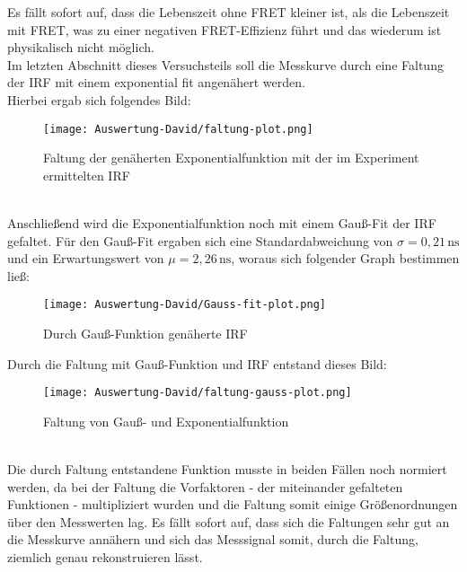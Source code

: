 Es fällt sofort auf, dass die Lebenszeit ohne FRET kleiner ist, als die Lebenszeit mit FRET, was zu einer negativen FRET-Effizienz führt und das wiederum ist physikalisch nicht möglich. \\
Im letzten Abschnitt dieses Versuchsteils soll die Messkurve durch eine Faltung der IRF mit einem exponential fit angenähert werden.\\
\newpage
Hierbei ergab sich folgendes Bild:\\
\begin{figure}[h]
	\centering
	\texttt{[image: Auswertung-David/faltung-plot.png]}
	\caption{Faltung der genäherten Exponentialfunktion mit der im Experiment ermittelten IRF}
	\label{Faltung von IRF und Exponentialfkt.}
\end{figure}\\
Anschließend wird die Exponentialfunktion noch mit einem Gauß-Fit der IRF gefaltet.  Für den Gauß-Fit ergaben sich eine Standardabweichung von $\sigma=0,21\,\mathrm{ns}$ und ein Erwartungswert von $\mu=2,26\,\mathrm{ns}$, woraus sich folgender Graph bestimmen ließ:
\begin{figure}[h]
	\centering
	\texttt{[image: Auswertung-David/Gauss-fit-plot.png]}
	\caption{Durch Gauß-Funktion genäherte IRF}
	\label{Gauss-Fit}
\end{figure}
\newpage
Durch die Faltung mit Gauß-Funktion und IRF entstand dieses Bild:
\begin{figure}[h]
	\centering
	\texttt{[image: Auswertung-David/faltung-gauss-plot.png]}
	\caption{Faltung von Gauß- und Exponentialfunktion}
	\label{Faltung mit Gauss-Fit}
\end{figure}\\
Die durch Faltung entstandene Funktion musste in beiden Fällen noch normiert werden, da bei der Faltung die Vorfaktoren - der miteinander gefalteten Funktionen - multipliziert wurden und die Faltung somit einige Größenordnungen über den Messwerten lag. Es fällt sofort auf, dass sich die Faltungen sehr gut an die Messkurve annähern und sich das Messsignal somit, durch die Faltung, ziemlich genau rekonstruieren lässt.